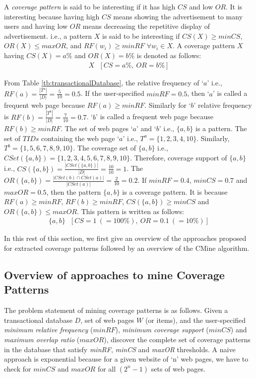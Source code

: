 	A \emph{coverage pattern} is said to be interesting if it has high $CS$ and low $OR$. It is interesting because having high $CS$ means showing the advertisement to many users and having low $OR$ means decreasing the repetitive display of advertisement. i.e., a pattern $X$ is said to be interesting if $CS(X) \geq minCS$, $OR(X) \leq maxOR$, and $RF(w_i) \geq minRF$ $\forall w_i \in X$. A coverage pattern $X$ having $CS(X)=a\%$ and $OR(X)=b\%$ is denoted as follows:
\begin{eqnarray}
\label{coveragePattern}
X~~~[CS=a\%, ~ OR=b\%] \nonumber
\end{eqnarray}

\begin{myexp}
\label{ex:coveragePatternExample}
From Table \ref{tb:transactionalDatabase}, the relative frequency of `$a$' i.e., $RF(a)=\frac{|T^{a}|}{|D|}=\frac{5}{10}=0.5$. If the user-specified $minRF=0.5$, then `$a$' is called a frequent web page because $RF(a) \geq minRF$. Similarly for `$b$' relative frequency is  $RF(b)=\frac{|T^{b}|}{|D|}=\frac{7}{10}=0.7$. `$b$' is called a frequent web page because $RF(b) \geq minRF$. The set of web pages `$a$' and `$b$' i.e., $\{a,b\}$ is a pattern. The set of $TIDs$ containing the web page `$a$' i.e., $T^{a} =\{1, 2, 3, 4, 10\}$. Similarly, $T^{b}=\{1, 5, 6, 7, 8, 9, 10\}$. The coverage set of $\{a,b\}$ i.e., $CSet(\{a,b\}) = \{1, 2, 3, 4, 5, 6, 7, 8, 9, 10\} $. Therefore, coverage support of $\{a,b\}$ i.e., $ CS(\{a,b\}) = \frac{|CSet(\{a,b\})|}{|D|} = \frac{10}{10}=1$.  The $OR(\{a,b\}) = \frac{|CSet(b) \cap CSet(a)|}{|CSet(a)|} = \frac{2}{10} = 0.2$. If $minRF=0.4$, $minCS=0.7$ and $maxOR=0.5$, then the pattern $\{a,b\}$ is a coverage pattern. It is because $RF(a) \geq minRF$, $RF(b) \geq minRF$, $CS(\{a,b\}) \geq minCS$ and $OR(\{a,b\}) \leq maxOR$. This pattern is written as follows:
\begin{eqnarray}
\{a,b\} ~~~[CS=1 ~(=100\%), ~OR= 0.1~(=10\%)] \nonumber
\end{eqnarray}
\end{myexp}

In this rest of this section, we first give an overview of the approaches proposed for extracted coverage patterns followed by an overview of the CMine algorithm.

	
\subsection{Overview of approaches to mine Coverage Patterns}
\label{sec:CovPatternMining}
The problem statement of mining coverage patterns is as follows. Given a transactional database $D$, set of web pages $W$ (or items), and the user-specified \emph{minimum relative frequency} ($minRF$), \emph{minimum coverage support} ($minCS$) and \emph{maximum overlap ratio} ($maxOR$), discover the complete set of coverage patterns in the database that satisfy \emph{minRF}, \emph{minCS} and \emph{maxOR} thresholds. A naive approach is exponential because for a given website of `n' web pages, we have to check for $minCS$ and $maxOR$ for all $(2^n-1)$ sets of web pages. 

